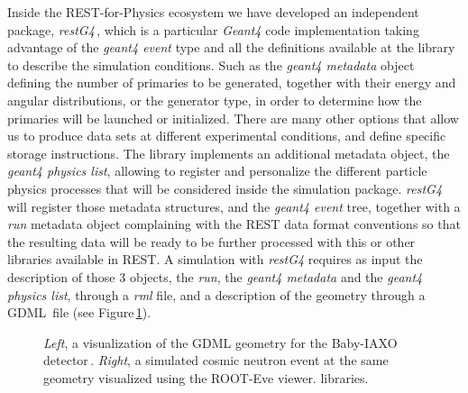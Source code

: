 Inside the REST-for-Physics ecosystem we have developed an independent package, \emph{restG4}\,\cite{REST_restG4_Git}, which is a particular \emph{Geant4} code implementation taking advantage of the \emph{geant4 event} type and all the definitions available at the library to describe the simulation conditions. Such as the \emph{geant4 metadata} object defining the number of primaries to be generated, together with their energy and angular distributions, or the generator type, in order to determine how the primaries will be launched or initialized. There are many other options that allow us to produce data sets at different experimental conditions, and define specific storage instructions. The library implements an additional metadata object, the \emph{geant4 physics list}, allowing to register and personalize the different particle physics processes that will be considered inside the simulation package. \emph{restG4} will register those metadata structures, and the \emph{geant4 event} tree, together with a \emph{run} metadata object complaining with the REST data format conventions so that the resulting data will be ready to be further processed with this or other libraries available in REST. A simulation with \emph{restG4} requires as input the description of those 3 objects, the \emph{run}, the \emph{geant4 metadata} and the \emph{geant4 physics list}, through a \emph{rml} file, and a description of the geometry through a GDML\,\cite{Chytracek:2006be} file (see Figure\,\ref{fig:geant4lib}).



\begin{figure}[htb!]
  \centering
	\caption{\emph{Left}, a visualization of the GDML geometry for the Baby-IAXO detector\,\cite{BabyIAXO:2020mzw}. \emph{Right}, a simulated cosmic neutron event at the same geometry visualized using the ROOT-Eve viewer. libraries.}\label{fig:geant4lib}
\end{figure}

